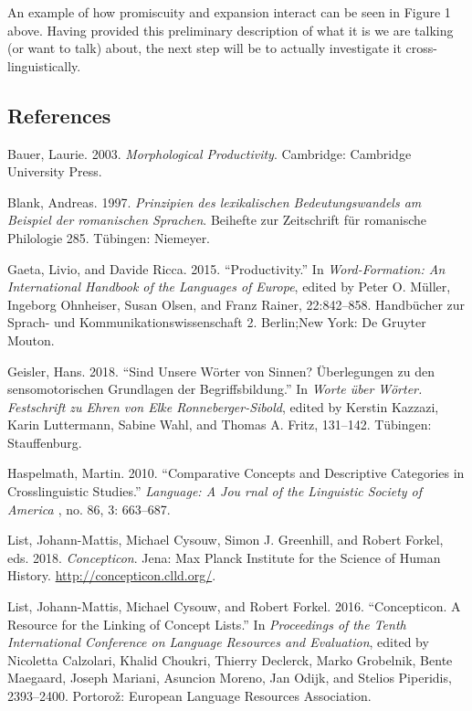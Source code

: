 \documentclass[
  a4paper,
  14pt,
  oneside,
  tablecaptionabove
]{scrbook}
\begin{document}
An example of how
promiscuity and expansion interact can be seen in Figure 1 above. Having
provided this preliminary description of what it is we are talking (or
want to talk) about, the next step will be to actually investigate it
cross-linguistically.

\subsection*{References}

\nopagebreak\hangindent=0.7cm {\small Bauer, Laurie. 2003. \emph{Morphological Productivity}.  Cambridge:
Cambridge University Press. }

\nopagebreak\hangindent=0.7cm {\small Blank, Andreas. 1997. \emph{Prinzipien des lexikalischen
Bedeutungswandels am Beispiel der romanischen Sprachen}.  Beihefte zur
Zeitschrift für romanische Philologie 285. Tübingen: Niemeyer. }

\nopagebreak\hangindent=0.7cm {\small Gaeta, Livio, and Davide Ricca. 2015. \enquote{Productivity.} In
\emph{Word-Formation: An International Handbook of the Languages of
Europe}, edited by Peter O. Müller, Ingeborg Ohnheiser, Susan Olsen,
and Franz Rainer, 22:842--858. Handbücher zur Sprach- und
Kommunikationswissenschaft 2. Berlin;New York: De Gruyter Mouton. }

\nopagebreak\hangindent=0.7cm {\small Geisler, Hans. 2018. \enquote{Sind Unsere Wörter von Sinnen?
Überlegungen zu den sensomotorischen Grundlagen der Begriffsbildung.} In
\emph{Worte über Wörter. Festschrift zu Ehren von Elke
Ronneberger-Sibold}, edited by Kerstin Kazzazi, Karin Luttermann,
Sabine Wahl, and Thomas A. Fritz, 131--142. Tübingen: Stauffenburg. }

\nopagebreak\hangindent=0.7cm {\small Haspelmath, Martin. 2010. \enquote{Comparative Concepts and
Descriptive Categories in Crosslinguistic Studies.} \emph{Language: A
Jou { rnal of the Linguistic Society of America }}, no. 86, 3:
663--687. }

\nopagebreak\hangindent=0.7cm {\small List, Johann-Mattis, Michael Cysouw, Simon J. Greenhill, and Robert
Forkel, eds. 2018. \emph{Concepticon}.  Jena: Max Planck Institute for
the Science of Human History. \url{http://concepticon.clld.org/}.  }

\nopagebreak\hangindent=0.7cm {\small List, Johann-Mattis, Michael Cysouw, and Robert Forkel. 2016.
\enquote{Concepticon. A Resource for the Linking of Concept Lists.} In
\emph{Proceedings of the Tenth International Conference on Language
Resources and Evaluation}, edited by Nicoletta Calzolari, Khalid
Choukri, Thierry Declerck, Marko Grobelnik, Bente Maegaard, Joseph
Mariani, Asuncion Moreno, Jan Odijk, and Stelios Piperidis, 2393--2400.
Portorož: European Language Resources Association. }
\end{document}
